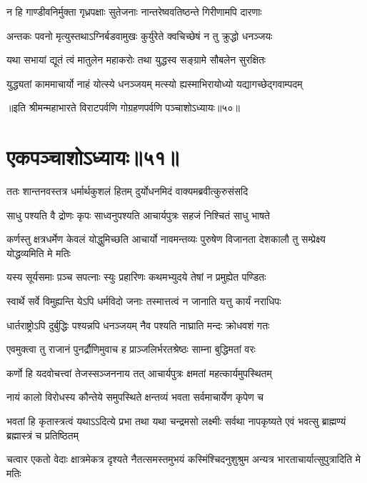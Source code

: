 \twolineshloka
{न हि गाण्डीवनिर्मुक्ता गृध्रपक्षाः सुतेजनाः}
{नान्तरेष्ववतिष्ठन्ते गिरीणामपि दारणाः}


\twolineshloka
{अन्तकः पवनो मृत्युस्तथाऽग्निर्बडवामुखः}
{कुर्युरेते क्वचिच्छेषं न तु क्रुद्धो धनञ्जयः}


\twolineshloka
{यथा सभायां द्यूतं त्वं मातुलेन महाकरोः}
{तथा युद्धस्व सङ्ग्रामे सौबलेन सुरक्षितः}


\twolineshloka
{युद्ध्यतां काममाचार्यो नाहं योत्स्ये धनञ्जयम्}
{मत्स्यो ह्यस्माभिरायोध्यो यद्यागच्छेद्गवाम्पदम्}

॥इति श्रीमन्महाभारते विराटपर्वणि गोग्रहणपर्वणि पञ्चाशोऽध्यायः॥५०॥

\chapter{एकपञ्चाशोऽध्यायः॥५१॥}

\twolineshloka
{ततः शान्तनवस्तत्र धर्मार्थकुशलं हितम्}
{दुर्योधनमिदं वाक्यमब्रवीत्कुरुसंसदि}


\twolineshloka
{साधु पश्यति वै द्रोणः कृपः साध्वनुपश्यति}
{आचार्यपुत्रः सहजं निश्चितं साधु भाषते}


\threelineshloka
{कर्णस्तु क्षत्रधर्मेण केवलं योद्धुमिच्छति}
{आचार्यो नावमन्तव्यः पुरुषेण विजानता}
{देशकालौ तु सम्प्रेक्ष्य योद्धव्यमिति मे मतिः}


\twolineshloka
{यस्य सूर्यसमाः प़ञ्च सपत्नाः स्युः प्रहारिणः}
{कथमभ्युदये तेषां न प्रमुह्येत पण्डितः}


\twolineshloka
{स्वार्थे सर्वे विमुह्यन्ति येऽपि धर्मविदो जनाः}
{तस्मात्तत्वं न जानाति यत्तु कार्यं नराधिपः}


\twolineshloka
{धार्तराष्ट्रोऽपि दुर्बुद्धिः पश्यन्नपि धनञ्जयम्}
{नैव पश्यति नाघ्राति मन्दः क्रोधवशं गतः}



\twolineshloka
{एवमुक्त्वा तु राजानं पुनर्द्रौणिमुवाच ह}
{प्राञ्जलिर्भरतश्रेष्ठः साम्ना बुद्धिमतां वरः}


\twolineshloka
{कर्णो हि यदवोचत्त्वां तेजस्सञ्जननाय तत्}
{आचार्यपुत्रः क्षमतां महत्कार्यमुपस्थितम्}


\twolineshloka
{नायं कालो विरोधस्य कौन्तेये समुपस्थिते}
{क्षन्तव्यं भवता सर्वमाचार्येण कृपेण च}


\threelineshloka
{भवतां हि कृतास्त्रत्वं यथाऽऽदित्ये प्रभा तथा}
{यथा चन्द्रमसो लक्ष्मीः सर्वथा नापकृष्यते}
{एवं भवत्सु ब्राह्मण्यं ब्रह्मास्त्रं च प्रतिष्ठितम्}


\threelineshloka
{चत्वार एकतो वेदाः क्षात्रमेकत्र दृश्यते}
{नैतत्समस्तमुभयं कस्मिंश्चिदनुशुश्रुम}
{अन्यत्र भारताचार्यात्सुपुत्रादिति मे मतिः}


